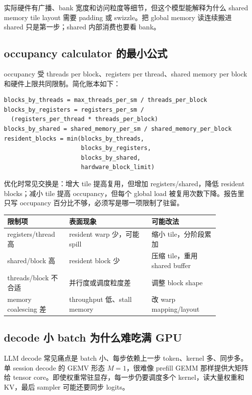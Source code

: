 实际硬件有广播、bank 宽度和访问粒度等细节，但这个模型能解释为什么 shared memory tile layout 需要 padding 或 swizzle。把 global memory 读连续搬进 shared 只是第一步；shared 内部消费也要看 bank。

\subsection{occupancy calculator 的最小公式}

occupancy 受 threads per block、registers per thread、shared memory per block 和硬件上限共同限制。简化账本如下：

\begin{lstlisting}[numbers=none,caption={occupancy 限制项}]
blocks_by_threads = max_threads_per_sm / threads_per_block
blocks_by_registers = registers_per_sm /
  (registers_per_thread * threads_per_block)
blocks_by_shared = shared_memory_per_sm / shared_memory_per_block
resident_blocks = min(blocks_by_threads,
                      blocks_by_registers,
                      blocks_by_shared,
                      hardware_block_limit)
\end{lstlisting}

优化时常见交换是：增大 tile 提高复用，但增加 registers/shared，降低 resident blocks；减小 tile 提高 occupancy，但每个 global load 被复用次数下降。报告里只写 occupancy 百分比不够，必须写是哪一项限制了驻留。

\begin{center}
\begin{tabular}{p{0.24\linewidth}p{0.34\linewidth}p{0.28\linewidth}}
\toprule
限制项 & 表面现象 & 可能改法 \\
\midrule
registers/thread 高 & resident warp 少，可能 spill & 缩小 tile，分阶段累加 \\
shared/block 高 & resident block 少 & 压缩 tile，重用 shared buffer \\
threads/block 不合适 & 并行度或调度粒度差 & 调整 block shape \\
memory coalescing 差 & throughput 低、stall memory & 改 warp mapping/layout \\
\bottomrule
\end{tabular}
\end{center}

\subsection{decode 小 batch 为什么难吃满 GPU}

LLM decode 常见痛点是 batch 小、每步依赖上一步 token、kernel 多、同步多。单 session decode 的 GEMV 形态 \(M=1\)，很难像 prefill GEMM 那样提供大矩阵给 tensor core。即使权重常驻显存，每一步仍要调度多个 kernel，读大量权重和 KV，最后 sampler 可能还要同步 logits。

